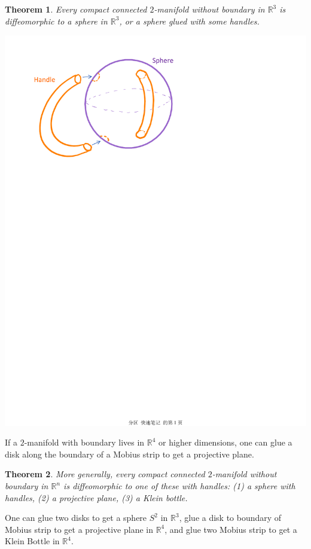 \documentclass[11pt,oneside]{book}
\theoremstyle{break}
\theoremstyle{break}
\newtheorem{thm}{Theorem}[section]
\newcommand{\R}{\mathbb{R}}
\begin{document}
\begin{thm}
Every compact connected $2$-manifold without boundary in $\R^3$ is diffeomorphic to a sphere in $\R^3$, or a sphere glued with some handles.
\begin{center}
\includegraphics[scale=0.8]{handleBody.pdf}
\end{center}
\end{thm}

If a $2$-manifold with boundary lives in $\R^4$ or higher dimensions, one can glue a disk along the boundary of a Mobius strip to get a projective plane.\\

\begin{thm}
More generally, every compact connected $2$-manifold without boundary in $\R^n$ is diffeomorphic to one of these with handles: (1) a sphere with handles, (2) a projective plane, (3) a Klein bottle.
\end{thm}

One can glue two disks to get a sphere $S^2$ in $\R^3$, glue a disk to boundary of Mobius strip to get a projective plane in $\R^4$, and glue two Mobius strip to get a Klein Bottle in $\R^4$.
\end{document}
